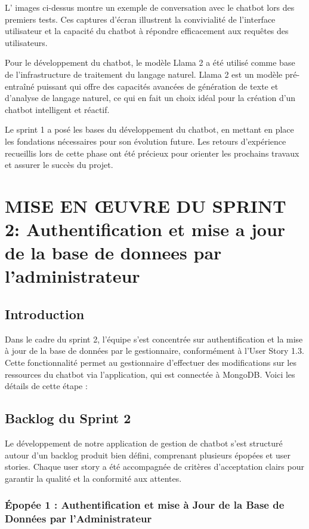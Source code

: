 \documentclass[a4paper, 11pt, openany]{report}
\begin{document}
L' images ci-dessus montre un exemple de conversation avec le chatbot lors des premiers tests. Ces captures d'écran illustrent la convivialité de l'interface utilisateur et la capacité du chatbot à répondre efficacement aux requêtes des utilisateurs.


Pour le développement du chatbot, le modèle Llama 2 a été utilisé comme base de l'infrastructure de traitement du langage naturel. Llama 2 est un modèle pré-entraîné puissant qui offre des capacités avancées de génération de texte et d'analyse de langage naturel, ce qui en fait un choix idéal pour la création d'un chatbot intelligent et réactif.

Le sprint 1 a posé les bases du développement du chatbot, en mettant en place les fondations nécessaires pour son évolution future. Les retours d'expérience recueillis lors de cette phase ont été précieux pour orienter les prochains travaux et assurer le succès du projet.




\chapter{MISE EN ŒUVRE DU SPRINT 2: Authentification et mise a jour de la base de donnees par l’administrateur}
\section{Introduction}

Dans le cadre du sprint 2, l'équipe s'est concentrée sur authentification et la mise à jour de la base de données par le gestionnaire, conformément à l'User Story 1.3. Cette fonctionnalité permet au gestionnaire d'effectuer des modifications sur les ressources du chatbot via l'application, qui est connectée à MongoDB. Voici les détails de cette étape :

\section{Backlog du Sprint 2}

Le développement de notre application de gestion de chatbot s’est structuré autour d’un backlog produit bien défini, comprenant plusieurs épopées et user stories. Chaque user story a été accompagnée de critères d’acceptation clairs pour garantir la qualité et la conformité aux attentes.

\subsection{Épopée 1 : Authentification et mise à Jour de la Base de Données par l’Administrateur}
\end{document}
